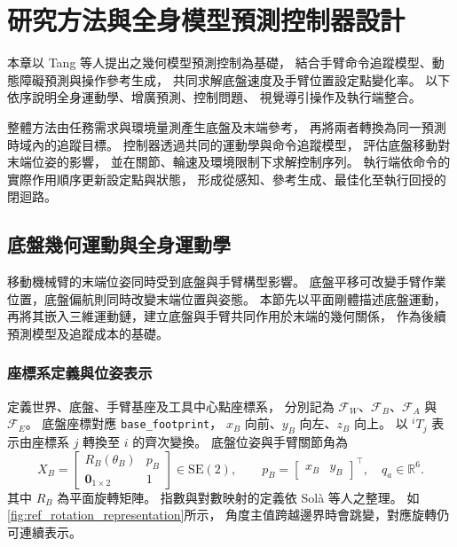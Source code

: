 \chapter{研究方法與全身模型預測控制器設計}
\label{c:methodology}
\label{c:Mathodology}

本章以 Tang 等人\cite{tang2024gmpc}提出之幾何模型預測控制為基礎，
結合手臂命令追蹤模型、動態障礙預測與操作參考生成，
共同求解底盤速度及手臂位置設定點變化率。
以下依序說明全身運動學、增廣預測、控制問題、
視覺導引操作及執行端整合。

整體方法由任務需求與環境量測產生底盤及末端參考，
再將兩者轉換為同一預測時域內的追蹤目標。
控制器透過共同的運動學與命令追蹤模型，
評估底盤移動對末端位姿的影響，
並在關節、輪速及環境限制下求解控制序列。
執行端依命令的實際作用順序更新設定點與狀態，
形成從感知、參考生成、最佳化至執行回授的閉迴路。

\section{底盤幾何運動與全身運動學}
\label{sec:wholebody_kinematics}

移動機械臂的末端位姿同時受到底盤與手臂構型影響。
底盤平移可改變手臂作業位置，底盤偏航則同時改變末端位置與姿態。
本節先以平面剛體描述底盤運動，
再將其嵌入三維運動鏈，建立底盤與手臂共同作用於末端的幾何關係，
作為後續預測模型及追蹤成本的基礎。

\subsection{座標系定義與位姿表示}
\label{subsec:frames_pose_representation}

定義世界、底盤、手臂基座及工具中心點座標系，
分別記為 $\mathcal F_W$、$\mathcal F_B$、$\mathcal F_A$ 與 $\mathcal F_E$。
底盤座標對應 \texttt{base\_footprint}，
$x_B$ 向前、$y_B$ 向左、$z_B$ 向上。
以 $ {}^iT_j$ 表示由座標系 $j$ 轉換至 $i$ 的齊次變換。
底盤位姿與手臂關節角為
\begin{equation}
    X_B=
    \begin{bmatrix}
        R_B(\theta_B)&p_B\\
        \mathbf 0_{1\times2}&1
    \end{bmatrix}\in\mathrm{SE}(2),
    \qquad
    p_B=\begin{bmatrix}x_B&y_B\end{bmatrix}^{\top},
    \quad q_a\in\mathbb R^6 .
    \label{eq:ch3_base_pose}
\end{equation}
其中 $R_B$ 為平面旋轉矩陣。
指數與對數映射的定義依 Sol\`a 等人\cite{sola2018micro}之整理。
如\cref{fig:ref_rotation_representation}所示，
角度主值跨越邊界時會跳變，對應旋轉仍可連續表示。

